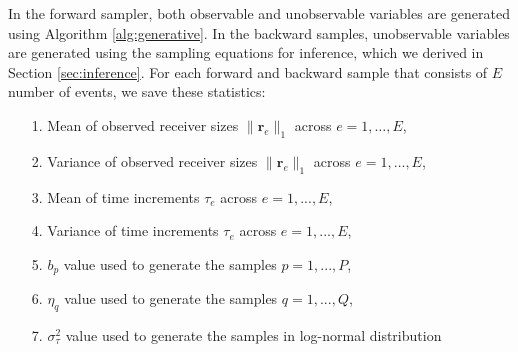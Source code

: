 \documentclass[ba]{imsart}
\numberwithin{equation}{section}
\theoremstyle{plain}
\begin{document}
	In the forward sampler, both observable and unobservable variables are generated using Algorithm \ref{alg:generative}. In the backward samples, unobservable variables are generated using the sampling equations for inference, which we derived in Section \ref{sec:inference}. For each forward and backward sample that consists of $E$ number of events, we save these statistics:\\
	\begin{itemize}
		\item[1.] Mean of observed receiver sizes $ \lVert \boldsymbol{r}_{e} \rVert_1 $ across $e=1,\ldots,E$,
		\item[2.] Variance of observed receiver sizes $ \lVert \boldsymbol{r}_{e} \rVert_1 $ across $e=1,\ldots,E$,
		\item[3.] Mean of time increments $\tau_e$ across $e=1,...,E$,
		\item[4.] Variance of time increments $\tau_e$ across $e=1,...,E$,
		\item[5.] $b_p$ value used to generate the samples $p = 1,...,P$,
		\item[6.] $\eta_q$ value used to generate the samples $q = 1,...,Q$,
		\item[7.] $\sigma^2_\tau$ value used to generate the samples in log-normal distribution
	\end{itemize}
	
\end{document}
